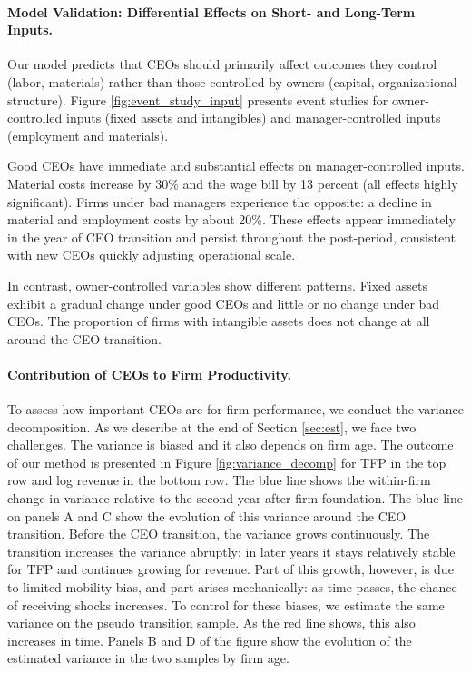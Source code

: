 \documentclass[11pt,a4paper]{article}
\begin{document}
\paragraph{Model Validation: Differential Effects on Short- and Long-Term Inputs.} Our model predicts that CEOs should primarily affect outcomes they control (labor, materials) rather than those controlled by owners (capital, organizational structure). Figure \ref{fig:event_study_input} presents event studies for owner-controlled inputs (fixed assets and intangibles) and manager-controlled inputs (employment and materials).

Good CEOs have immediate and substantial effects on manager-controlled inputs. Material costs increase by 30\% and the wage bill by 13 percent (all effects highly significant). Firms under bad managers experience the opposite: a decline in material and employment costs by about 20\%. These effects appear immediately in the year of CEO transition and persist throughout the post-period, consistent with new CEOs quickly adjusting operational scale.

In contrast, owner-controlled variables show different patterns. Fixed assets exhibit a gradual change under good CEOs and little or no change under bad CEOs. The proportion of firms with intangible assets does not change at all around the CEO transition.

\paragraph{Contribution of CEOs to Firm Productivity.} To assess how important CEOs are for firm performance, we conduct the variance decomposition. As we describe at the end of Section \ref{sec:est}, we face two challenges. The variance is biased and it also depends on firm age. The outcome of our method is presented in Figure \ref{fig:variance_decomp} for TFP in the top row and log revenue in the bottom row. The blue line shows the within-firm change in variance relative to the second year after firm foundation. The blue line on panels A and C show the evolution of this variance around the CEO transition. Before the CEO transition, the variance grows continuously. The transition increases the variance abruptly; in later years it stays relatively stable for TFP and continues growing for revenue. Part of this growth, however, is due to limited mobility bias, and part arises mechanically: as time passes, the chance of receiving shocks increases. To control for these biases, we estimate the same variance on the pseudo transition sample. As the red line shows, this also increases in time. Panels B and D of the figure show the evolution of the estimated variance in the two samples by firm age. 
\end{document}
